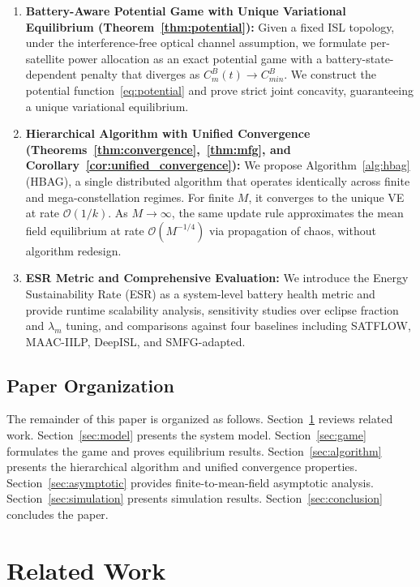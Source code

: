 \documentclass[journal]{IEEEtran}
\newcommand{\CB}{C^{B}}
\newcommand{\CBmin}{C^{B}_{min}}
\begin{document}
\begin{enumerate}
\item \textbf{Battery-Aware Potential Game with Unique
Variational Equilibrium (Theorem~\ref{thm:potential}):}
Given a fixed ISL topology, under the interference-free optical channel assumption, we formulate per-satellite power allocation as an exact potential game with a battery-state-dependent penalty that diverges as $\CB_m(t)\to\CBmin$. We construct the potential function~\eqref{eq:potential} and prove strict joint concavity, guaranteeing a unique variational equilibrium.

\item \textbf{Hierarchical Algorithm with Unified
Convergence (Theorems~\ref{thm:convergence},~\ref{thm:mfg}, and Corollary~\ref{cor:unified_convergence}):}
We propose Algorithm~\ref{alg:hbag} (HBAG), a single distributed algorithm that operates identically across finite and mega-constellation regimes. For finite $M$, it converges to the unique VE at rate $\mathcal{O}(1/k)$. As $M\to\infty$, the same update rule approximates the mean field equilibrium at rate $\mathcal{O}(M^{-1/4})$ via propagation of chaos, without algorithm redesign.

\item \textbf{ESR Metric and Comprehensive Evaluation:}
We introduce the Energy Sustainability Rate (ESR) as a system-level battery health metric and provide runtime scalability analysis, sensitivity studies over eclipse fraction and $\lambda_m$ tuning, and comparisons against four baselines including SATFLOW, MAAC-IILP, DeepISL, and SMFG-adapted.
\end{enumerate}

\subsection{Paper Organization}

The remainder of this paper is organized as follows. Section~\ref{sec:related} reviews related work. Section~\ref{sec:model} presents the system model. Section~\ref{sec:game} formulates the game and proves equilibrium results. Section~\ref{sec:algorithm} presents the hierarchical algorithm and unified convergence properties. Section~\ref{sec:asymptotic} provides finite-to-mean-field asymptotic analysis. Section~\ref{sec:simulation} presents simulation results. Section~\ref{sec:conclusion} concludes the paper.

\section{Related Work}
\label{sec:related}
\end{document}
